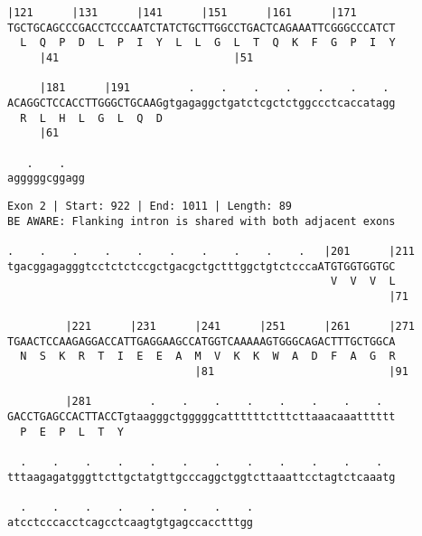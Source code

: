 \documentclass{article}
\begin{document}
\newpage
\begin{Verbatim}[fontfamily=courier]
     |121      |131      |141      |151      |161      |171 
TGCTGCAGCCCGACCTCCCAATCTATCTGCTTGGCCTGACTCAGAAATTCGGGCCCATCT
  L  Q  P  D  L  P  I  Y  L  L  G  L  T  Q  K  F  G  P  I  Y
     |41                           |51                      

     |181      |191         .    .    .    .    .    .    . 
ACAGGCTCCACCTTGGGCTGCAAGgtgagaggctgatctcgctctggccctcaccatagg
  R  L  H  L  G  L  Q  D                                    
     |61                                                    

   .    .   
agggggcggagg
\end{Verbatim}
\newpage
\begin{Verbatim}[fontfamily=courier]
Exon 2 | Start: 922 | End: 1011 | Length: 89
BE AWARE: Flanking intron is shared with both adjacent exons

.    .    .    .    .    .    .    .    .    .   |201      |211
tgacggagagggtcctctctccgctgacgctgctttggctgtctcccaATGTGGTGGTGC
                                                  V  V  V  L
                                                           |71

         |221      |231      |241      |251      |261      |271
TGAACTCCAAGAGGACCATTGAGGAAGCCATGGTCAAAAAGTGGGCAGACTTTGCTGGCA
  N  S  K  R  T  I  E  E  A  M  V  K  K  W  A  D  F  A  G  R
                             |81                           |91

         |281         .    .    .    .    .    .    .    .  
GACCTGAGCCACTTACCTgtaagggctgggggcattttttctttcttaaacaaatttttt
  P  E  P  L  T  Y                                          

  .    .    .    .    .    .    .    .    .    .    .    .  
tttaagagatgggttcttgctatgttgcccaggctggtcttaaattcctagtctcaaatg

  .    .    .    .    .    .    .    .
atcctcccacctcagcctcaagtgtgagccacctttgg
\end{Verbatim}
\newpage
\end{document}
